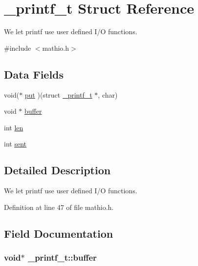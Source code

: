 \hypertarget{struct__printf__t}{}\section{\+\_\+printf\+\_\+t Struct Reference}
\label{struct__printf__t}


We let printf use user defined I/O functions.  




{\ttfamily \#include $<$mathio.\+h$>$}

\subsection*{Data Fields}
\begin{DoxyCompactItemize}
\item 
void($\ast$ \hyperlink{struct__printf__t_a3ef8eb0143b93d4446b04c6ce9313be7}{put} )(struct \hyperlink{struct__printf__t}{\+\_\+printf\+\_\+t} $\ast$, char)
\item 
void $\ast$ \hyperlink{struct__printf__t_ad35884151d0be6667caafad8caacc76f}{buffer}
\item 
int \hyperlink{struct__printf__t_a5139902cde74159b79e6418a34712bee}{len}
\item 
int \hyperlink{struct__printf__t_a872716fd701166cd57bd3fffb7b77706}{sent}
\end{DoxyCompactItemize}


\subsection{Detailed Description}
We let printf use user defined I/O functions. 

Definition at line 47 of file mathio.\+h.



\subsection{Field Documentation}
\subsubsection[{\texorpdfstring{buffer}{buffer}}]{\setlength{\rightskip}{0pt plus 5cm}void$\ast$ \+\_\+printf\+\_\+t\+::buffer}\hypertarget{struct__printf__t_ad35884151d0be6667caafad8caacc76f}{}\label{struct__printf__t_ad35884151d0be6667caafad8caacc76f}


